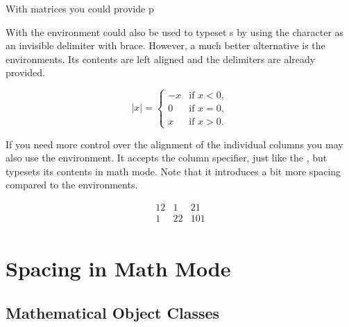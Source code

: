 With matrices you could provide p

With the  environment could also be used to typeset s by using the  character as an invisible 
delimiter with brace. However, a much better alternative is the 
environments. Its contents are left aligned and the delimiters are already
provided.
\begin{example}
\[
  \lvert x \rvert = 
  \begin{cases}
    -x & \text{if } x < 0, \\
    0  & \text{if } x = 0, \\
    x  & \text{if } x > 0.
  \end{cases} 
\]
\end{example}

If you need more control over the alignment of the individual columns you may
also use the  environment. It accepts the column specifier, just like
the , but typesets its contents in math mode. Note that it
introduces a bit more spacing compared to the  environments.
\begin{example}
\[
  \begin{array}{rcl}
    12 & 1 & 21 \\
    1 & 22 & 101 \\
  \end{array}
\]
\end{example}

\section{Spacing in Math Mode}\label{sec:math-spacing}%

\subsection{Mathematical Object Classes}

